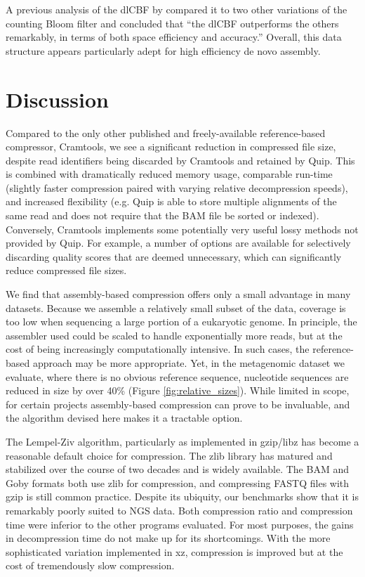 \documentclass[a4,center,fleqn]{NAR}
\begin{document}
A previous analysis of the dlCBF by \citet{Zhang2009} compared it to two other
variations of the counting Bloom filter and concluded that ``the dlCBF
outperforms the others remarkably, in terms of both space efficiency and
accuracy.'' Overall, this data structure appears particularly adept for high
efficiency de novo assembly.

\section{Discussion}

Compared to the only other published and freely-available reference-based
compressor, Cramtools, we see a significant reduction in compressed file size,
despite read identifiers being discarded by Cramtools and retained by Quip.
This is combined with dramatically reduced memory usage, comparable run-time
(slightly faster compression paired with varying relative decompression
speeds), and increased flexibility (e.g. Quip is able to store multiple
alignments of the same read and does not require that the BAM file be sorted
or indexed). Conversely, Cramtools implements some potentially very useful
lossy methods not provided by Quip. For example, a number of options are
available for selectively discarding quality scores that are deemed
unnecessary, which can significantly reduce compressed file sizes.

We find that assembly-based compression offers only a small advantage in many
datasets. Because we assemble a relatively small subset of the data, coverage
is too low when sequencing a large portion of a eukaryotic genome. In
principle, the assembler used could be scaled to handle exponentially more
reads, but at the cost of being increasingly computationally intensive. In
such cases, the reference-based approach may be more appropriate. Yet, in the
metagenomic dataset we evaluate, where there is no obvious reference sequence,
nucleotide sequences are reduced in size by over 40\% (Figure
\ref{fig:relative_sizes}). While limited in scope, for certain projects
assembly-based compression can prove to be invaluable, and the algorithm devised
here makes it a tractable option.

The Lempel-Ziv algorithm, particularly as implemented in gzip/libz has become
a reasonable default choice for compression. The zlib library has matured and
stabilized over the course of two decades and is widely available. The BAM and
Goby formats both use zlib for compression, and compressing FASTQ files with
gzip is still common practice. Despite its ubiquity, our benchmarks show that
it is remarkably poorly suited to NGS data. Both compression ratio and
compression time were inferior to the other programs evaluated. For most
purposes, the gains in decompression time do not make up for its shortcomings.
With the more sophisticated variation implemented in xz, compression is improved
but at the cost of tremendously slow compression.
\end{document}
